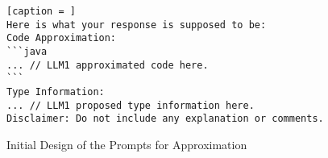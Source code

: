 \begin{figure}[t]
\begin{minipage}{.5\textwidth}
\begin{lstlisting}[caption = ]
Here is what your response is supposed to be:
Code Approximation:
```java
... // LLM1 approximated code here.
```
Type Information:
... // LLM1 proposed type information here.
Disclaimer: Do not include any explanation or comments.
\end{lstlisting}
\end{minipage}
\vspace{-12pt}
\caption{Initial Design of the Prompts for Approximation}
\label{fig:approx-prompt}
\end{figure}
